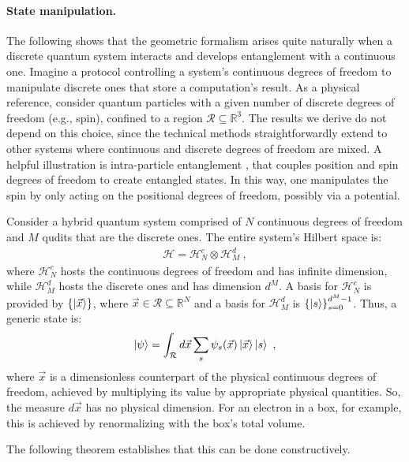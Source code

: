 \documentclass[nofootinbib,pre,twocolumn,showpacs,showkeys,groupaddress,preprintnumbers,floatfix]{revtex4-1}
\newcommand{\1}{\mathbbm{1}}
\begin{document}
\paragraph*{State manipulation.}
The following shows that the geometric formalism arises quite naturally when a
discrete quantum system interacts and develops entanglement with a continuous
one. Imagine a protocol controlling a system's continuous degrees of freedom to
manipulate discrete ones that store a computation's result. As a physical
reference, consider quantum particles with a given number of discrete degrees
of freedom (e.g., spin), confined to a region $\mathcal{R} \subseteq
\mathbb{R}^3$. The results we derive do not depend on this choice, since the
technical methods straightforwardly extend to other systems where continuous
and discrete degrees of freedom are mixed. A helpful illustration is
intra-particle entanglement \cite{Pasini2020}, that couples position and spin
degrees of freedom to create entangled states. In this way, one manipulates the spin
by only acting on the positional degrees of freedom, possibly via a potential.

Consider a hybrid quantum system comprised of $N$ continuous degrees of freedom
and $M$ qudits that are the discrete ones. The entire system's Hilbert space
is:
\begin{align*}
\mathcal{H} = \mathcal{H}^c_N \otimes \mathcal{H}^d_M
  ~,
\end{align*}
where $\mathcal{H}_N^c$ hosts the continuous degrees of freedom and has
infinite dimension, while $\mathcal{H}^d_M$ hosts the discrete ones and has
dimension $d^M$. A basis for $\mathcal{H}_N^c$ is provided by
$\left\{\ket{\vec{x}}\right\}$, where $\vec{x} \in \mathcal{R} \subseteq
\mathbb{R}^N$ and a basis for $\mathcal{H}_M^d$ is
$\left\{\ket{s}\right\}_{s=0}^{d^M-1}$. Thus, a generic state is:
\begin{align*}
\ket{\psi} = \int_{\mathcal{R}} d\vec{x} \sum_{s} \psi_s(\vec{x})\ket{\vec{x}} \ket{s}
  ~,
\end{align*}
where $\vec{x}$ is a dimensionless counterpart of the physical continuous
degrees of freedom, achieved by multiplying its value by appropriate physical
quantities. So, the measure $d\vec{x}$ has no physical dimension. For an
electron in a box, for example, this is achieved by renormalizing with the box's
total volume.

The following theorem establishes that this can be done constructively.
\end{document}
